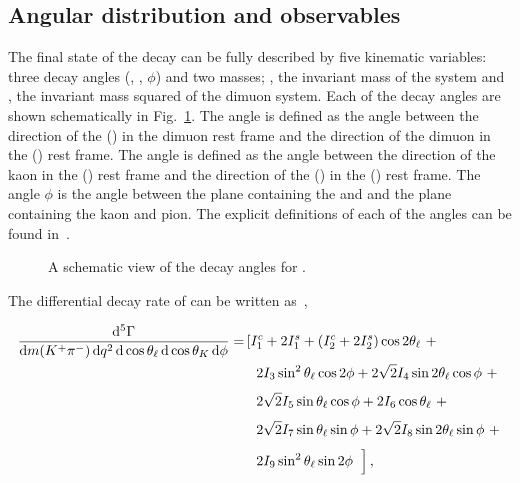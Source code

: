 \subsection{Angular distribution and observables}
\label{sec:kpimm:angular-distribution}

The final state of the decay \BdToKpimm can be fully described by five kinematic variables: three decay angles (\ctl, \ctk, $\phi$) and two masses; \mkpi, the invariant mass of the \kaon\pion system and \qsq, the invariant mass squared of the dimuon system. Each of the decay angles are shown schematically in Fig.~\ref{fig:kpimm:angles}. The angle \thetal is defined as the angle between the direction of the \mup (\mun) in the dimuon rest frame and the direction of the dimuon in the \Bz (\Bzb) rest frame. The angle \thetak is defined as the angle between the direction of the kaon in the \KstarJ (\KstarJb) rest frame and the direction of the \KstarJ (\KstarJb) in the \Bz (\Bzb) rest frame. The angle $\phi$ is the angle between the plane containing the \mup and \mun and the plane containing the kaon and pion. The explicit definitions of each of the angles can be found in~\cite{kstmm-1fb}.

\begin{figure}[!htb]
  \centering
  
  \caption{A schematic view of the decay angles for \BdToKpimm.}
  \label{fig:kpimm:angles}
\end{figure}

The differential decay rate of \BdToKpimm can be written as~\cite{altmannshofer},

\begin{equation}
\begin{aligned}
\frac{\mathrm{d}^{5}\Gamma}{\mathrm{d}m({{K}^+}{{\pi}^-})\,\mathrm{d}{q^2}\,\mathrm{d}\cos\theta_{\ell}\,\mathrm{d}\cos\theta_{K}\,\mathrm{d}\phi} = & \left[ I_1^c+2I_1^s+(I_2^c+2I_2^s)\cos2\theta_{\ell}~+ \right.\\
& \left. ~\frac{}{} 2I_3\sin^2\theta_{\ell}\cos2\phi+2\sqrt{2}I_4\sin2\theta_{\ell}\cos\phi~+ \right.\\
& \left. ~\frac{}{} 2\sqrt{2}I_5\sin\theta_{\ell}\cos\phi+2I_6\cos\theta_{\ell}~+ \right. \\
& \left. ~\frac{}{} 2\sqrt{2}I_7\sin\theta_{\ell}\sin\phi+2\sqrt{2}I_8\sin2\theta_{\ell}\sin\phi~+ \right. \\
& \left. ~\frac{}{} 2I_9\sin^2\theta_{\ell}\sin2\phi \frac{}{}~\right],
\end{aligned}
\end{equation}

